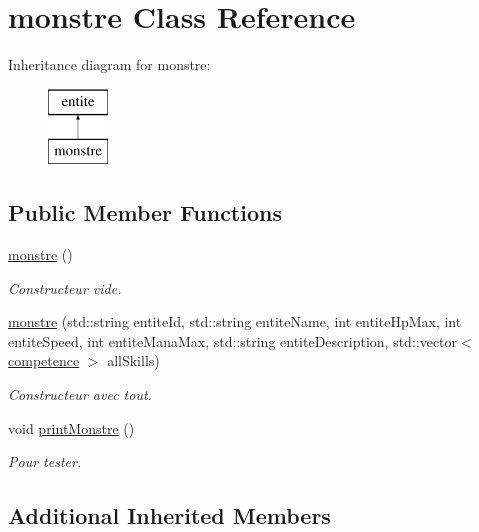 \hypertarget{classmonstre}{}\section{monstre Class Reference}
\label{classmonstre}
Inheritance diagram for monstre\+:\begin{figure}[H]
\begin{center}
\leavevmode
\includegraphics[height=2.000000cm]{classmonstre}
\end{center}
\end{figure}
\subsection*{Public Member Functions}
\begin{DoxyCompactItemize}
\item 
\mbox{\label{classmonstre_a718cb1c5f9297f00e42e6b884ca85d6d}} 
\hyperlink{classmonstre_a718cb1c5f9297f00e42e6b884ca85d6d}{monstre} ()
\begin{DoxyCompactList}\small\item\em Constructeur vide. \end{DoxyCompactList}\item 
\hyperlink{classmonstre_a863d9f9a553a2e3a49d16182dd004da8}{monstre} (std\+::string entite\+Id, std\+::string entite\+Name, int entite\+Hp\+Max, int entite\+Speed, int entite\+Mana\+Max, std\+::string entite\+Description, std\+::vector$<$ \hyperlink{classcompetence}{competence} $>$ all\+Skills)
\begin{DoxyCompactList}\small\item\em Constructeur avec tout. \end{DoxyCompactList}\item 
\mbox{\label{classmonstre_aeb60395664bbca7846e037b058b5c716}} 
void \hyperlink{classmonstre_aeb60395664bbca7846e037b058b5c716}{print\+Monstre} ()
\begin{DoxyCompactList}\small\item\em Pour tester. \end{DoxyCompactList}\end{DoxyCompactItemize}
\subsection*{Additional Inherited Members}


